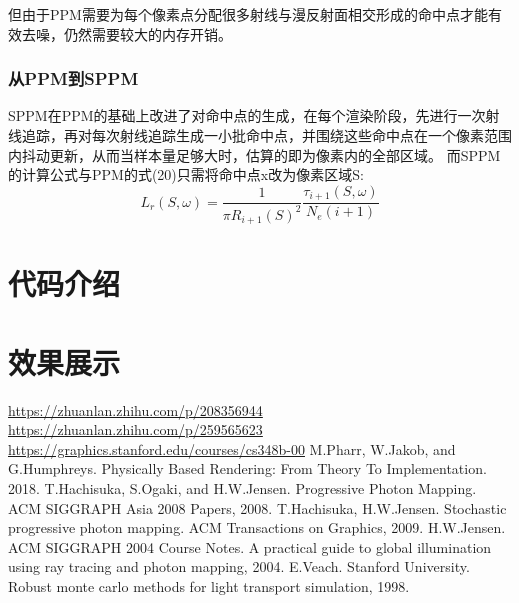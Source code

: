 \documentclass[12pt]{article}
\begin{document}
但由于PPM需要为每个像素点分配很多射线与漫反射面相交形成的命中点才能有效去噪，仍然需要较大的内存开销。
\subsubsection{从PPM到SPPM}
SPPM在PPM的基础上改进了对命中点的生成，在每个渲染阶段，先进行一次射线追踪，再对每次射线追踪生成一小批命中点，并围绕这些命中点在一个像素范围内抖动更新，从而当样本量足够大时，估算的即为像素内的全部区域。
而SPPM的计算公式与PPM的式(20)只需将命中点x改为像素区域S:
\begin{equation}
    L_r(S,\omega)=\frac{1}{\pi R_{i+1}(S)^2}\frac{\tau_{i+1}(S,\omega)}{N_e(i+1)}
\end{equation}

\section{代码介绍}



\section{效果展示}


\begin{thebibliography}{3}
     \url{https://zhuanlan.zhihu.com/p/208356944}
     \url{https://zhuanlan.zhihu.com/p/259565623}
     \url{https://graphics.stanford.edu/courses/cs348b-00}
     M.Pharr, W.Jakob, and G.Humphreys. Physically Based Rendering: From Theory To Implementation. 2018.
     T.Hachisuka, S.Ogaki, and H.W.Jensen. Progressive Photon Mapping. ACM SIGGRAPH Asia 2008 Papers, 2008.
     T.Hachisuka, H.W.Jensen. Stochastic progressive photon mapping. ACM Transactions on Graphics, 2009.
     H.W.Jensen. ACM SIGGRAPH 2004 Course Notes. A practical guide to global illumination using ray tracing and photon mapping, 2004.
     E.Veach. Stanford University. Robust monte carlo methods for light transport simulation, 1998.
\end{thebibliography}
\end{document}
